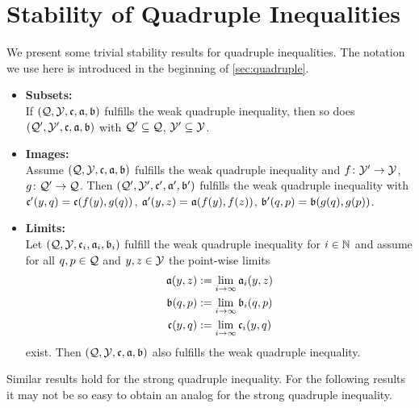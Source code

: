 \section{Stability of Quadruple Inequalities} \label{app:quad_stab}
%
%
We present some trivial stability results for quadruple inequalities. The notation we use here is introduced in the beginning of \autoref{sec:quadruple}.
%
\begin{itemize}
\item[]
	\hspace*{-0.5cm}\textbf{Subsets:}\\
	If $(\mathcal{Q}, \mathcal{Y}, \mathfrak{c}, \mathfrak{a}, \mathfrak{b})$ fulfills the weak quadruple inequality, then so does \linebreak$(\mathcal{Q}^\prime, \mathcal{Y}^\prime, \mathfrak{c}, \mathfrak{a}, \mathfrak{b})$ with $\mathcal{Q}^\prime \subseteq \mathcal{Q}$, $\mathcal{Y}^\prime \subseteq \mathcal{Y}$.
\item[]
	\hspace*{-0.5cm}\textbf{Images:}\\
	Assume $(\mathcal{Q}, \mathcal{Y}, \mathfrak{c}, \mathfrak{a}, \mathfrak{b})$ fulfills the weak quadruple inequality and $f\colon\mathcal{Y}^\prime\to\mathcal{Y}$, $g\colon\mathcal{Q}^\prime\to\mathcal{Q}$. Then $(\mathcal{Q}^\prime, \mathcal{Y}^\prime, \mathfrak{c}^\prime, \mathfrak{a}^\prime, \mathfrak{b}^\prime)$ fulfills the weak quadruple inequality with $\mathfrak{c}^\prime(y,q) = \mathfrak{c}(f(y), g(q))$, $\mathfrak{a}^\prime(y,z) = \mathfrak{a}(f(y), f(z))$, $\mathfrak{b}^\prime(q,p) = \mathfrak{b}(g(q), g(p))$.
\item[]
	\hspace*{-0.5cm}\textbf{Limits:}\\
	Let $(\mathcal{Q}, \mathcal{Y}, \mathfrak{c}_i, \mathfrak{a}_i, \mathfrak{b}_i)$ fulfill the weak quadruple inequality for $i \in \mathbb{N}$ and assume for all $q,p\in\mathcal{Q}$ and $y,z\in\mathcal{Y}$ the point-wise limits 
	\begin{align*}
		\mathfrak{a}(y,z) &:= \lim_{i\to\infty} \mathfrak{a}_i(y,z)\\
		\mathfrak{b}(q,p) &:= \lim_{i\to\infty} \mathfrak{b}_i(q,p)\\
		\mathfrak{c}(y,q) &:= \lim_{i\to\infty} \mathfrak{c}_i(y,q)
	\end{align*}
	exist. Then $(\mathcal{Q}, \mathcal{Y}, \mathfrak{c}, \mathfrak{a}, \mathfrak{b})$ also fulfills the weak quadruple inequality.
\end{itemize}
Similar results hold for the strong quadruple inequality. For the following results it may not be so easy to obtain an analog for the strong quadruple inequality.
